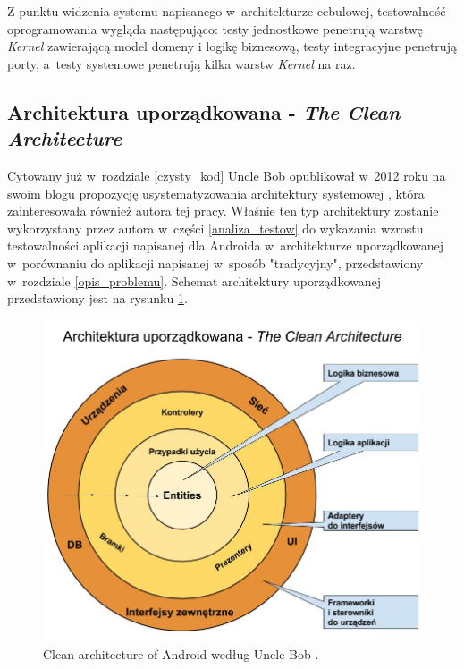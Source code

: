 Z punktu widzenia systemu napisanego w~architekturze cebulowej, testowalność oprogramowania wygląda następująco: testy jednostkowe penetrują warstwę \textit{Kernel} zawierającą model domeny i logikę biznesową, testy integracyjne penetrują porty, a~testy systemowe penetrują kilka warstw \textit{Kernel} na raz.

\subsection{Architektura uporządkowana - \textit{The Clean Architecture}}
\label{clean_architecture_opis}
Cytowany już w~rozdziale \ref{czysty_kod} Uncle Bob opublikował w~2012 roku na swoim blogu propozycję usystematyzowania architektury systemowej \cite{website:cecil:blog}, która zainteresowała również autora tej pracy. Właśnie ten typ architektury zostanie wykorzystany przez autora w~części \ref{analiza_testow} do wykazania wzrostu testowalności aplikacji napisanej dla Androida w~architekturze uporządkowanej w~porównaniu do aplikacji napisanej w~sposób "tradycyjny", przedstawiony w~rozdziale \ref{opis_problemu}. Schemat architektury uporządkowanej przedstawiony jest na rysunku \ref{fig:clean_architecture}.
\newpage

\begin{figure}[!htb]
    \centering
    \includegraphics[width=13cm]{imgs/ch4_clean_architecture_pl.jpg}
    \caption
{Clean architecture of Android według Uncle Bob  \cite{website:cecil:blog}.}
    \label{fig:clean_architecture}
\end{figure} 

